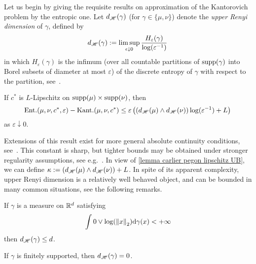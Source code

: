 Let us begin by giving the requisite results on approximation of the Kantorovich problem by the entropic one. 
Let $d_{\mathscr{H}}(\gamma)$ (for $\gamma\in\{\mu,\nu\}$) denote the \textit{upper Renyi dimension} of $\gamma$, defined by 
\[ d_{\mathscr{H}}(\gamma):=\limsup_{\epsilon\downarrow0}\frac{H_\varepsilon(\gamma)}{\log(\varepsilon^{-1})}\,\]
in which $H_\varepsilon(\gamma)$ is the infimum (over all countable partitions of $\text{supp}(\gamma)$ into Borel subsets of diameter at most $\varepsilon$) of the discrete entropy of $\gamma$ with respect to the partition, see~\cite{carlier_convergence_2023}.

\begin{lemma}\label{lemma carlier pegon lipschitz UB}
    If $c^*$ is $L$-Lipschitz on $\text{supp}(\mu)\times\text{supp}(\nu)$, then
    \[\text{Ent.}(\mu,\nu,c^*,\varepsilon) - \text{Kant.}(\mu,\nu,c^*)\le \varepsilon\left((d_{\mathscr{H}}(\mu)\wedge d_{\mathscr{H}}(\nu))\log(\varepsilon^{-1}) + L \right) \,\]
    as $\varepsilon\downarrow0$.
\end{lemma}

Extensions of this result exist for more general absolute continuity conditions, see~\cite[Rem.~3.4]{carlier_convergence_2023}. This constant is sharp, but tighter bounds may be obtained under stronger regularity assumptions, see e.g.~\cite[Prop.~3.7]{carlier_convergence_2023}. In view of \cref{lemma carlier pegon lipschitz UB}, we can define $\kappa:= (d_{\mathscr{H}}(\mu)\wedge d_{\mathscr{H}}(\nu)) + L$. In spite of its apparent complexity, upper Renyi dimension is a relatively well behaved object, and can be bounded in many common situations, see the following remarks.

\begin{remark}
    If $\gamma$ is a measure on $\mathbb{R}^d$ satisfying
    \[ \int 0\vee\log(\left\lVert x\right\rVert_2)\mathrm{d}\gamma(x)<+\infty\]
    then $d_{\mathscr{H}}(\gamma)\le d$.
\end{remark}

\begin{remark}
    If $\gamma$ is finitely supported, then $d_{\mathscr{H}}(\gamma)=0$. 
\end{remark}



\ThmKantorovichRegret*




